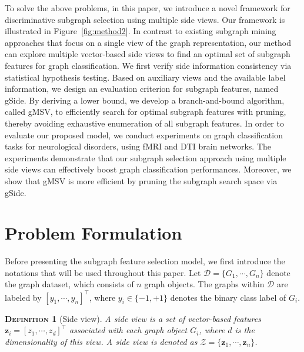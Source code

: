 \documentclass[conference]{IEEEtran}
\newcommand{\gscore}[0]{gSide}
\newcommand{\galgo}[0]{gMSV}
\newtheorem{Definition}{\textsc{Definition}}
\begin{document}
To solve the above problems, in this paper, we introduce a novel framework for discriminative subgraph selection using multiple side views. Our framework is illustrated in Figure~\ref{fig:method2}. In contrast to existing subgraph mining approaches that focus on a single view of the graph representation, our method can explore multiple vector-based side views to find an optimal set of subgraph features for graph classification. We first verify side information consistency via statistical hypothesis testing. Based on auxiliary views and the available label information, we design an evaluation criterion for subgraph features, named {\gscore}. By deriving a lower bound, we develop a branch-and-bound algorithm, called {\galgo}, to efficiently search for optimal subgraph features with pruning, thereby avoiding exhaustive enumeration of all subgraph features. In order to evaluate our proposed model, we conduct experiments on graph classification tasks for neurological disorders, using fMRI and DTI brain networks. The experiments demonstrate that our subgraph selection approach using multiple side views can effectively boost graph classification performances. Moreover, we show that {\galgo} is more efficient by pruning the subgraph search space via {\gscore}.


\section{Problem Formulation}\label{sec:problem}

Before presenting the subgraph feature selection model, we first introduce the notations that will be used throughout this paper. Let $\mathcal{D}=\{G_1,\cdots,G_n\}$ denote the graph dataset, which consists of $n$ graph objects. The graphs within $\mathcal{D}$ are labeled by $[y_1,\cdots,y_n]^\top$, where $y_i\in\{-1,+1\}$ denotes the binary class label of $G_i$.

\begin{Definition}[Side view]
A side view is a set of vector-based features $\mathbf{z}_i=[z_1,\cdots,z_d]^\top$ associated with each graph object $G_i$, where $d$ is the dimensionality of this view. A side view is denoted as $\mathcal{Z}=\{\mathbf{z}_1,\cdots,\mathbf{z}_n\}$.
\end{Definition}
\end{document}
